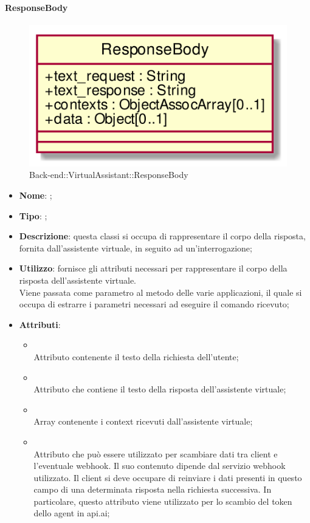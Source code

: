 \hypertarget{ResponseBody_label}{\paragraph{ResponseBody}}
\begin{figure}[h]
	\centering
	\includegraphics[width=\textwidth,height=\textheight,keepaspectratio]{images/ClassResponseBody.png}
	\caption{Back-end::VirtualAssistant::ResponseBody}
\end{figure}
\begin{itemize}
	\item \textbf{Nome}: ;
	\item \textbf{Tipo}: ;
	\item \textbf{Descrizione}: questa classi si occupa di rappresentare il corpo della risposta, fornita dall'assistente virtuale, in seguito ad un'interrogazione;
	\item \textbf{Utilizzo}: fornisce gli attributi necessari per rappresentare il corpo della risposta dell'assistente virtuale. \\
Viene passata come parametro al metodo  delle varie applicazioni, il quale si occupa di estrarre i parametri necessari ad eseguire il comando ricevuto;
	\item \textbf{Attributi}:
	\begin{itemize}
		\item[]  \\
		Attributo contenente il testo della richiesta dell'utente;
		\item[]  \\
		Attributo che contiene il testo della risposta dell'assistente virtuale;
		\item[]  \\
		Array contenente i context ricevuti dall'assistente virtuale;
		\item[]  \\
		Attributo che può essere utilizzato per scambiare dati tra client e l'eventuale webhook. Il suo contenuto dipende dal servizio webhook utilizzato. Il client si deve occupare di reinviare i dati presenti in questo campo di una determinata risposta nella richiesta successiva. In particolare, questo attributo viene utilizzato per lo scambio del token dello agent in api.ai;
	\end{itemize}
\end{itemize}
\FloatBarrier

